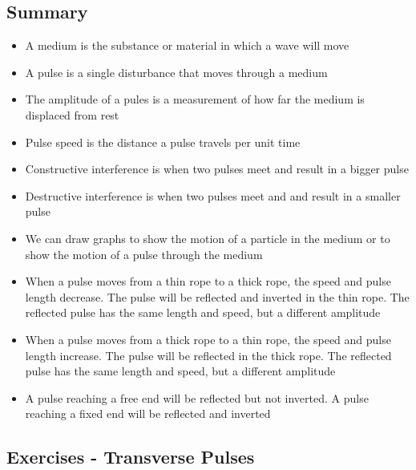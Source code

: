             \subsection{ Summary}
            \nopagebreak
            \label{m38802*eip-404}\begin{itemize}[noitemsep]
            \item A medium is the substance or material in which a wave will move\item A pulse is a single disturbance that moves through a medium\item The amplitude of a pules is a measurement of how far the medium is displaced from rest\item Pulse speed is the distance a pulse travels per unit time\item Constructive interference is when two pulses meet and result in a bigger pulse\item Destructive interference is when two pulses meet and and result in a smaller pulse\item We can draw graphs to show the motion of a particle in the medium or to show the motion of a pulse through the medium\item When a pulse moves from a thin rope to a thick rope, the speed and pulse length decrease. The pulse will be reflected and inverted in the thin rope. The reflected pulse has the same length and speed, but a different amplitude\item When a pulse moves from a thick rope to a thin rope, the speed and pulse length increase. The pulse will be reflected in the thick rope. The reflected pulse has the same length and speed, but a different amplitude\item A pulse reaching a free end will be reflected but not inverted. A pulse reaching a fixed end will be reflected and inverted\end{itemize}
        \label{m38802*cid9}
            \subsection{ Exercises - Transverse Pulses}
            \nopagebreak
            
